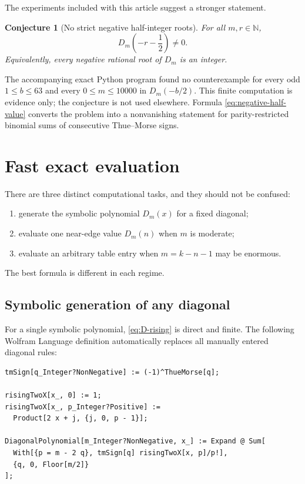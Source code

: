 \documentclass[11pt,oneside]{article}
\newtheorem{conjecture}[theorem]{Conjecture}
\theoremstyle{definition}
\theoremstyle{remark}
\newcommand{\N}{\mathbb N}
\newcommand{\Diag}{D}
\begin{document}
The experiments included with this article suggest a stronger statement.

\begin{conjecture}[No strict negative half-integer roots]
\label{conj:no-negative-strict-half}
For all $m,r\in\N$,
\begin{equation}
 \Diag_m\!\left(-r-\frac12\right)\ne0.
 \label{eq:no-negative-strict-half}
\end{equation}
Equivalently, every negative rational root of $\Diag_m$ is an integer.
\end{conjecture}

The accompanying exact Python program found no counterexample for every odd
$1\le b\le63$ and every $0\le m\le10000$ in
$\Diag_m(-b/2)$.  This finite computation is evidence only; the conjecture is
not used elsewhere.  Formula \eqref{eq:negative-half-value} converts the
problem into a nonvanishing statement for parity-restricted binomial sums of
consecutive Thue--Morse signs.

\section{Fast exact evaluation}
\label{sec:algorithms}

There are three distinct computational tasks, and they should not be confused:
\begin{enumerate}
 \item generate the symbolic polynomial $\Diag_m(x)$ for a fixed diagonal;
 \item evaluate one near-edge value $\Diag_m(n)$ when $m$ is moderate;
 \item evaluate an arbitrary table entry when $m=k-n-1$ may be enormous.
\end{enumerate}
The best formula is different in each regime.

\subsection{Symbolic generation of any diagonal}

For a single symbolic polynomial, \eqref{eq:D-rising} is direct and finite.
The following Wolfram Language definition automatically replaces all manually
entered diagonal rules:

\begin{lstlisting}[style=code,language=Wolfram]
tmSign[q_Integer?NonNegative] := (-1)^ThueMorse[q];

risingTwoX[x_, 0] := 1;
risingTwoX[x_, p_Integer?Positive] :=
  Product[2 x + j, {j, 0, p - 1}];

DiagonalPolynomial[m_Integer?NonNegative, x_] := Expand @ Sum[
  With[{p = m - 2 q}, tmSign[q] risingTwoX[x, p]/p!],
  {q, 0, Floor[m/2]}
];
\end{lstlisting}
\end{document}
